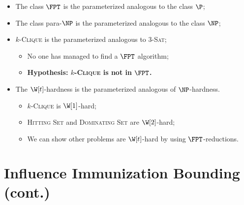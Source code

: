\documentclass[10pt,aspectratio=169,english]{beamer}
\begin{document}
\begin{frame}
	\begin{itemize}
		\item<1-> The class $\FPT$ is the parameterized analogous to the class $\P$;
		\item<1-> The class para-$\NP$ is the parameterized analogous to the class $\NP$;
		\item<2-> $k$-\textsc{Clique} is the parameterized analogous to \textsc{3-Sat};
		\begin{itemize}
			\item<2-> No one has managed to find a $\FPT$ algorithm;
			\item<2-> \textbf{Hypothesis: $k$-\textsc{Clique} is not in $\FPT$.}
		\end{itemize}
		\item<3-> The $\W[t]$-hardness is the parameterized analogous of $\NP$-hardness.
		\begin{itemize}
			\item<3-> $k$-\textsc{Clique} is $\W[1]$-hard;
			\item<3-> \textsc{Hitting Set} and \textsc{Dominating Set} are $\W[2]$-hard;
			\item<3-> We can show other problems are $\W[t]$-hard by using $\FPT$-reductions.
		\end{itemize}
	\end{itemize}
\end{frame}

\section{Influence Immunization Bounding (cont.)}
\end{document}
